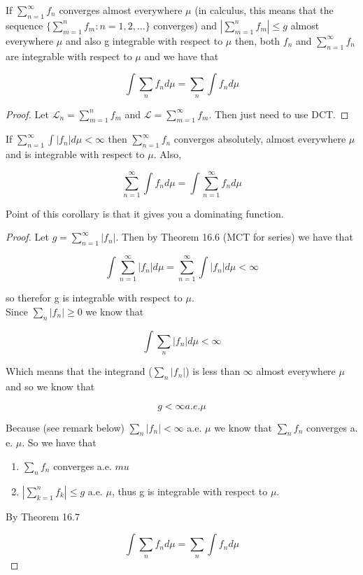 \documentclass[11pt,fleqn]{book} %
\begin{document}
\begin{theorem}
	If $\sum^\infty_{n=1} f_n$ converges almost everywhere $\mu$ (in calculus, this means that the sequence $\{\sum^n_{m=1} f_m: n = 1, 2, \dots\}$ converges) and $|\sum^n_{m=1} f_m| \leq g$ almost everywhere $\mu$ and also g integrable with respect to $\mu$ then, both $f_n$ and $\sum^\infty_{n=1} f_n$ are integrable with respect to $\mu$ and we have that

			$$\int \sum_n f_n d\mu = \sum_n \int f_n d\mu $$

\end{theorem}

\begin{proof}
	Let $\mathcal{L}_n = \sum^n_{m=1} f_m$ and $\mathcal{L} = \sum^\infty_{m=1} f_m $. Then just need to use DCT. 
\end{proof}

\begin{corollary}
	If $\sum^\infty_{n=1} \int |f_n| d\mu < \infty$ then $\sum^\infty_{n=1} f_n$ converges absolutely, almost everywhere $\mu$ and is integrable with respect to $\mu$. Also, 

		$$\sum^\infty_{n=1} \int f_n d\mu =  \int \sum^\infty_{n=1} f_n d\mu $$
\end{corollary}

Point of this corollary is that it gives you a dominating function.

\begin{proof}
	Let $g = \sum^\infty_{n=1} |f_n| $. Then by Theorem 16.6 (MCT for series) we have that

			$$\int \sum^\infty_{n=1} |f_n| d\mu =\sum^\infty_{n=1} \int  |f_n| d\mu < \infty $$

	so therefor g is integrable with respect to $\mu$.\\

	Since $\sum_n |f_n| \geq 0$ we know that 

		$$\int \sum_n |f_n| d\mu < \infty $$

	Which means that the integrand ($\sum_n |f_n|$) is less than $\infty$ almost everywhere $\mu$ and so we know that 

			$$g < \infty a.e. \mu $$

	Because (see remark below) $\sum_n |f_n| < \infty$ a.e. $\mu$ we know that $\sum_n f_n$ converges a. e. $\mu$. So we have that

			\begin{enumerate}
				\item $\sum_n f_n $ converges a.e. $mu$
				\item $|\sum^n_{k=1} f_k| \leq g$ a.e. $\mu$, thus g is integrable with respect to $\mu$. 
			\end{enumerate}

	By Theorem 16.7

			$$\int \sum_n f_n d\mu = \sum_n \int f_n d\mu $$

\end{proof}
\end{document}
